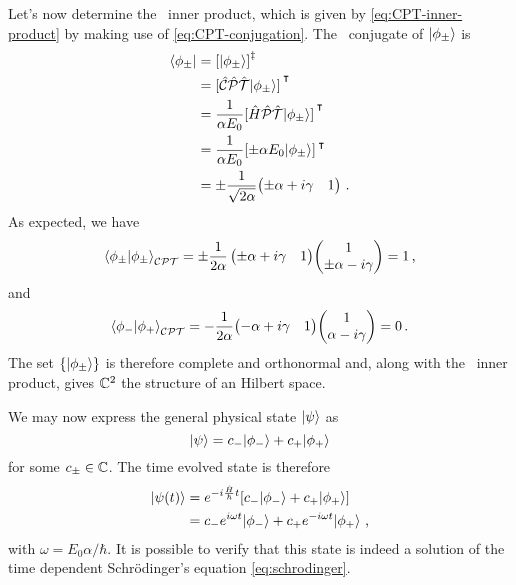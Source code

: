         Let's now determine the \CPT\ inner product, which is given by \eqref{eq:CPT-inner-product} by making use of \eqref{eq:CPT-conjugation}. The \CPT\ conjugate of $\ket{\phi_\pm}$ is
        \begin{align*}
            \bra{\phi_\pm}
            &= \bqty{\ket{\phi_\pm}}^\myconj \\
            &= \bqty*{\hCPT\!\ket{\phi_\pm}}^\intercal \\
            &= \frac{1}{\alpha E_0}\bqty*{\hH\hPT\!\ket{\phi_\pm}}^\intercal \\
            &= \frac{1}{\alpha E_0}\bqty*{\pm \alpha E_0 \! \ket{\phi_\pm}}^\intercal \\
            &= \pm\frac{1}{\sqrt{2\alpha}}\!\pmqty{\pm\alpha + i\gamma & 1}
            \myperiod
        \end{align*}
        As expected, we have
        \begin{equation}
            \braket{\phi_\pm}{\phi_\pm}_{\CPT} =  \pm\frac{1}{2\alpha}\pmqty{\pm\alpha + i\gamma & 1} \! \pmqty{1 \\ \pm\alpha - i \gamma} = 1
            \mycomma
        \end{equation}
        and
        \begin{equation}
            \braket{\phi_-}{\phi_+}_{\CPT} = -\frac{1}{2\alpha}\!\pmqty{-\alpha + i\gamma & 1}\!\pmqty{1 \\ \alpha - i \gamma} = 0
            \myperiod
        \end{equation}
        The set $\qty{\ket{\phi_\pm}}$ is therefore complete and orthonormal and, along with the \CPT\ inner product, gives $\mathbb{C}^2$ the structure of an Hilbert space.

        We may now express the general physical state $\ket{\psi}$ as 
        \begin{equation*}
            \ket{\psi} = c_{-}\!\ket{\phi_{-}} + c_{+}\!\ket{\phi_+}
        \end{equation*}
        for some $c_\pm\in\mathbb{C}$. The time evolved state is therefore
        \begin{align*}
            \ket{\psi\pqty{t}} 
            &= \myexp{-i\frac{\hH}{\hbar}t}\bqty*{c_{-}\!\ket{\phi_{-}} + c_{+}\!\ket{\phi_{+}}}\\
            &= c_{-}\myexp{i\omega t}\! \ket{\phi_{-}} + c_{+}\myexp{-i \omega t}\!\ket{\phi_{+}}
            \mycomma
        \end{align*}
        with $\omega = E_0 \alpha / \hbar$. It is possible to verify that this state is indeed a solution of the time dependent Schr\"odinger's equation \eqref{eq:schrodinger}.

